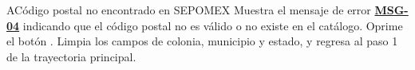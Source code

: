 \begin{UCtrayectoriaA}{A}{Código postal no encontrado en SEPOMEX}
	\UCpaso Muestra el mensaje de error \hyperlink{mMSG04}{\bf MSG-04} indicando que el código postal no es válido o no existe en el catálogo.
	\UCpaso[\UCactor] Oprime el botón .
	\UCpaso Limpia los campos de colonia, municipio y estado, y regresa al paso 1 de la trayectoria principal.
\end{UCtrayectoriaA}

